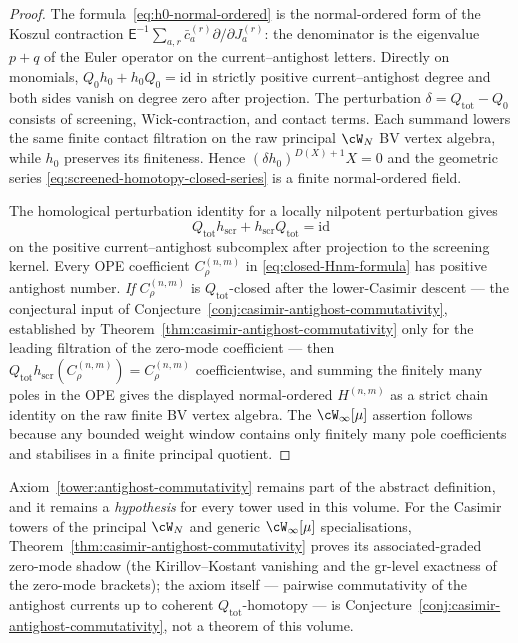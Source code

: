 \begin{proof}
The formula~\eqref{eq:h0-normal-ordered} is the normal-ordered form of
the Koszul contraction
$\mathsf E^{-1}\sum_{a,r}\bar c_a^{(r)}\partial/\partial J_a^{(r)}$:
the denominator is the eigenvalue $p+q$ of the Euler operator on the
current--antighost letters. Directly on monomials,
$Q_0h_0+h_0Q_0=\mathrm{id}$ in strictly positive
current--antighost degree and both sides vanish on degree zero after
projection. The perturbation $\delta=Q_{\mathrm{tot}}-Q_0$ consists of
screening, Wick-contraction, and contact terms. Each summand lowers the
same finite contact filtration on the raw principal $\cW_N$ BV vertex
algebra, while $h_0$ preserves its finiteness. Hence
$(\delta h_0)^{D(X)+1}X=0$ and the geometric series
\eqref{eq:screened-homotopy-closed-series} is a finite
normal-ordered field.

The homological perturbation identity for a locally nilpotent
perturbation gives
\[
Q_{\mathrm{tot}}h_{\mathrm{scr}}
+h_{\mathrm{scr}}Q_{\mathrm{tot}}
=\mathrm{id}
\]
on the positive current--antighost subcomplex after projection to the
screening kernel. Every OPE coefficient $C_\rho^{(n,m)}$ in
\eqref{eq:closed-Hnm-formula} has positive antighost number.
\emph{If} $C_\rho^{(n,m)}$ is $Q_{\mathrm{tot}}$-closed after the
lower-Casimir descent --- the conjectural input of
Conjecture~\ref{conj:casimir-antighost-commutativity}, established
by Theorem~\ref{thm:casimir-antighost-commutativity} only for the
leading filtration of the zero-mode coefficient --- then
$Q_{\mathrm{tot}}h_{\mathrm{scr}}(C_\rho^{(n,m)})
=C_\rho^{(n,m)}$ coefficientwise, and summing the finitely many poles
in the OPE gives the displayed normal-ordered $H^{(n,m)}$ as a strict
chain identity on the raw finite BV vertex algebra. The
$\cW_\infty[\mu]$ assertion follows because any bounded weight window
contains only finitely many pole coefficients and stabilises in a
finite principal quotient.
\end{proof}

\begin{remark}
\label{rem:axiom-T5-scope}
%
Axiom~\ref{tower:antighost-commutativity} remains part of the
abstract definition, and it remains a \emph{hypothesis} for every
tower used in this volume. For the Casimir towers of the principal
$\cW_N$ and generic $\cW_\infty[\mu]$ specialisations,
Theorem~\ref{thm:casimir-antighost-commutativity} proves its
associated-graded zero-mode shadow (the Kirillov--Kostant vanishing
and the gr-level exactness of the zero-mode brackets); the axiom
itself --- pairwise commutativity of the antighost currents up to
coherent $Q_{\mathrm{tot}}$-homotopy --- is
Conjecture~\ref{conj:casimir-antighost-commutativity}, not a theorem
of this volume.
\end{remark}

